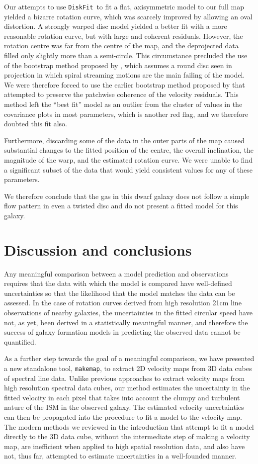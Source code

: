 \documentclass[letterpaper,fleqn,usenatbib]{mnras}
\def\DFt{{\tt DiskFit}}
\def\mkm{{\tt makemap}}
\begin{document}
Our attempts to use \DFt\ to fit a flat, axisymmetric model to our
full map yielded a bizarre rotation curve, which was scarcely improved
by allowing an oval distortion.  A strongly warped disc model yielded
a better fit with a more reasonable rotation curve, but with large and
coherent residuals.  However, the rotation centre was far from the
centre of the map, and the deprojected data filled only slightly more
than a semi-circle.  This circumstance precluded the use of the
bootstrap method proposed by \citet{SZS10}, which assumes a round disc
seen in projection in which spiral streaming motions are the main
failing of the model.  We were therefore forced to use the earlier
bootstrap method proposed by \citet{SS07} that attempted to preserve
the patchwise coherence of the velocity residuals.  This method left
the ``best fit'' model as an outlier from the cluster of values in the
covariance plots in most parameters, which is another red flag, and we
therefore doubted this fit also.

Furthermore, discarding some of the data in the outer parts of the map
caused substantial changes to the fitted position of the centre, the
overall inclination, the magnitude of the warp, and the estimated
rotation curve.  We were unable to find a significant subset of the
data that would yield consistent values for any of these parameters.

We therefore conclude that the gas in this dwarf galaxy does not
follow a simple flow pattern in even a twisted disc and do not present
a fitted model for this galaxy.

\section{Discussion and conclusions}
\label{sec.discuss}
Any meaningful comparison between a model prediction and observations
requires that the data with which the model is compared have
well-defined uncertainties so that the likelihood that the model
matches the data can be assessed.  In the case of rotation curves
derived from high resolution 21cm line observations of nearby
galaxies, the uncertainties in the fitted circular speed have not, as
yet, been derived in a statistically meaningful manner, and therefore
the success of galaxy formation models in predicting the observed data
cannot be quantified.

As a further step towards the goal of a meaningful comparison, we have
presented a new standalone tool, \mkm, to extract 2D velocity maps
from 3D data cubes of spectral line data.  Unlike previous approaches
to extract velocity maps from high resolution spectral data cubes, our
method estimates the uncertainty in the fitted velocity in each pixel
that takes into account the clumpy and turbulent nature of the ISM in
the observed galaxy.  The estimated velocity uncertainties can then be
propagated into the procedure to fit a model to the velocity map.  The
modern methods we reviewed in the introduction that attempt to fit a
model directly to the 3D data cube, without the intermediate step of
making a velocity map, are inefficient when applied to high
spatial resolution data, and also have not, thus far, attempted to
estimate uncertainties in a well-founded manner.
\end{document}
